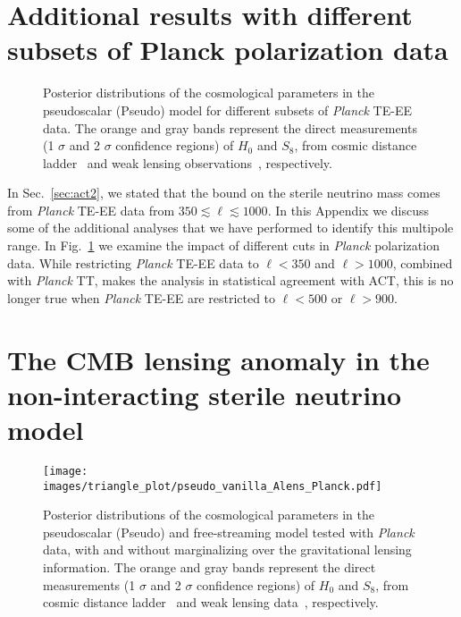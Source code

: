 \documentclass[a4paper,11pt]{article}
\begin{document}
\section{Additional results with different subsets of Planck polarization data}\label{App:C}

\begin{figure}[tb]
\centering
{}
\caption{Posterior distributions of the cosmological parameters in the pseudoscalar (Pseudo) model for different subsets of \emph{Planck} TE-EE data. The orange and gray bands represent the direct measurements (1 $\sigma$ and 2 $\sigma$ confidence regions) of $H_0$ and $S_8$, from cosmic distance ladder~\cite{Riess:2020fzl} and weak lensing observations~\cite{Gatti:2021uwl}, respectively.}
\label{fig:Planckcut_Appendice}
\end{figure}


In Sec.~\ref{sec:act2}, we stated that the bound on the sterile neutrino mass comes from \emph{Planck} TE-EE data from $350\lesssim\ell\lesssim1000$. In this Appendix we discuss some of the additional analyses that we have performed to identify this multipole range. In Fig.~\ref{fig:Planckcut_Appendice} we examine the impact of different cuts in \emph{Planck} polarization data. While restricting \emph{Planck} TE-EE data to $\ell<350$ and $\ell>1000$, combined with \emph{Planck} TT, makes the analysis in statistical agreement with ACT, this is no longer true when \emph{Planck} TE-EE are restricted to $\ell<500$ or $\ell>900$.


\section{The CMB lensing anomaly in the non-interacting sterile neutrino model} \label{App:sterile_Vanilla}

 \begin{figure}[t]
 \centering
   \texttt{[image: images/triangle\_plot/pseudo\_vanilla\_Alens\_Planck.pdf]}  
  \caption{ Posterior distributions of the cosmological parameters in the pseudoscalar (Pseudo) and free-streaming model tested with \emph{Planck} data, with and without marginalizing over the gravitational lensing information. The orange and gray bands represent the direct measurements (1 $\sigma$ and 2 $\sigma$ confidence regions) of $H_0$ and $S_8$, from cosmic distance ladder~\cite{Riess:2020fzl} and weak lensing data~\cite{Gatti:2021uwl}, respectively. }
  \label{Fig: Pseudo_Vanilla_Alens_planck}
\end{figure}
\end{document}
